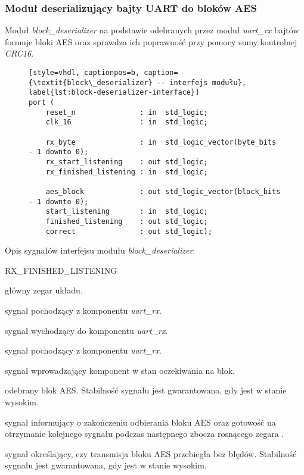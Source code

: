 \subsubsection{Moduł deserializujący bajty UART do bloków AES}
Moduł \textit{block\_deserializer} na podstawie odebranych przez moduł \textit{uart\_rx} bajtów formuje bloki AES oraz sprawdza ich poprawność przy pomocy sumy kontrolnej \textit{CRC16}.

\begin{figure}[!h]
\begin{lstlisting}[style=vhdl, captionpos=b, caption={\textit{block\_deserializer} -- interfejs modułu}, label{lst:block-deserializer-interface}]
port (
	reset_n               : in  std_logic;
	clk_16                : in  std_logic;

	rx_byte               : in  std_logic_vector(byte_bits - 1 downto 0);
	rx_start_listening    : out std_logic;
	rx_finished_listening : in  std_logic;

	aes_block             : out std_logic_vector(block_bits - 1 downto 0);
	start_listening       : in  std_logic;
	finished_listening    : out std_logic;
	correct               : out std_logic);
\end{lstlisting}
\end{figure}

Opis sygnałów interfejsu modułu \textit{block\_deserializer}:
\begin{interface}{RX\_FINISHED\_LISTENING}
	\item[\insignal{CLK\_16}] główny zegar układu.

	\item[\insignal{RX\_BYTE[7:0]}] sygnał pochodzący z komponentu \textit{uart\_rx}.
	\item[\outsignal{RX\_START\_LISTENING}] sygnał wychodzący do komponentu \textit{uart\_rx}.
	\item[\insignal{RX\_FINISHED\_LISTENING}] sygnał pochodzący z komponentu \textit{uart\_rx}.

	\item[\insignal{START\_LISTENING}] sygnał wprowadzający komponent w stan oczekiwania na blok.
	\item[\outsignal{AES\_BLOCK[127:0]}] odebrany blok AES. Stabilność sygnału jest gwarantowana, gdy  jest w stanie wysokim.
	\item[\outsignal{FINISHED\_LISTENING}] sygnał informujący o zakończeniu odbierania bloku AES oraz gotowość na otrzymanie kolejnego sygnału  podczas następnego zbocza rosnącego zegara .
	\item[\outsignal{CORRECT}] sygnał określający, czy transmisja bloku AES przebiegła bez błędów. Stabilność sygnału jest gwarantowana, gdy  jest w stanie wysokim.
\end{interface}


